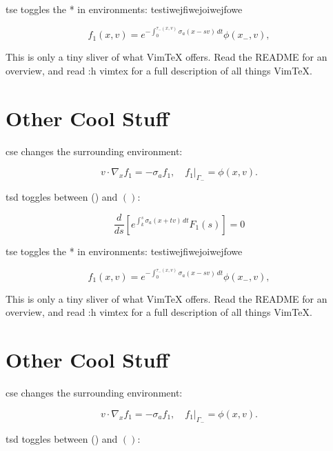 \documentclass{article}
\begin{document}
tse toggles the * in environments:
testiwejfiwejoiwejfowe

\begin{equation}
  f_1(x, v) = e^{-\int_0^{\tau_-(x, v)} \sigma_a(x - sv)\,dt} \phi(x_-, v),
\end{equation}

This is only a tiny sliver of what VimTeX offers.
Read the README for an overview, and read :h vimtex for a full description of
all things VimTeX.




\section{Other Cool Stuff}

cse changes the surrounding environment:

\begin{equation}
  v \cdot \nabla_x f_1 = -\sigma_a f_1, \quad f_1 \rvert_{\Gamma_-} = \phi(x,v).
\end{equation}

tsd toggles between () and \( \left( \right) \):

\begin{equation*}
  \frac{d}{ds} \left[ e^{\int_k^s \sigma_a(x + tv)\,dt} F_1(s) \right] = 0
\end{equation*}

tse toggles the * in environments:
testiwejfiwejoiwejfowe

\begin{equation}
  f_1(x, v) = e^{-\int_0^{\tau_-(x, v)} \sigma_a(x - sv)\,dt} \phi(x_-, v),
\end{equation}

This is only a tiny sliver of what VimTeX offers.
Read the README for an overview, and read :h vimtex for a full description of
all things VimTeX.




\section{Other Cool Stuff}

cse changes the surrounding environment:

\begin{equation}
  v \cdot \nabla_x f_1 = -\sigma_a f_1, \quad f_1 \rvert_{\Gamma_-} = \phi(x,v).
\end{equation}

tsd toggles between () and \( \left( \right) \):
\end{document}
